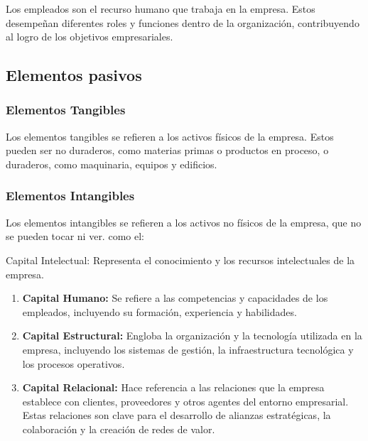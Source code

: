 \documentclass[
  a4paper,
]{article}
\begin{document}
Los empleados son el recurso humano que trabaja en la empresa. Estos
desempeñan diferentes roles y funciones dentro de la organización,
contribuyendo al logro de los objetivos empresariales.

\hypertarget{elementos-pasivos}{%
\subsection{Elementos pasivos}\label{elementos-pasivos}}

\hypertarget{elementos-tangibles}{%
\subsubsection{Elementos Tangibles}\label{elementos-tangibles}}

Los elementos tangibles se refieren a los activos físicos de la empresa.
Estos pueden ser no duraderos, como materias primas o productos en
proceso, o duraderos, como maquinaria, equipos y edificios.

\hypertarget{elementos-intangibles}{%
\subsubsection{Elementos Intangibles}\label{elementos-intangibles}}

Los elementos intangibles se refieren a los activos no físicos de la
empresa, que no se pueden tocar ni ver. como el:

Capital Intelectual: Representa el conocimiento y los recursos
intelectuales de la empresa.

\begin{enumerate}
\def\labelenumi{\alph{enumi}.}
\item
  \textbf{Capital Humano:} Se refiere a las competencias y capacidades
  de los empleados, incluyendo su formación, experiencia y habilidades.
\item
  \textbf{Capital Estructural:} Engloba la organización y la tecnología
  utilizada en la empresa, incluyendo los sistemas de gestión, la
  infraestructura tecnológica y los procesos operativos.
\item
  \textbf{Capital Relacional:} Hace referencia a las relaciones que la
  empresa establece con clientes, proveedores y otros agentes del
  entorno empresarial. Estas relaciones son clave para el desarrollo de
  alianzas estratégicas, la colaboración y la creación de redes de
  valor.
\end{enumerate}
\end{document}
